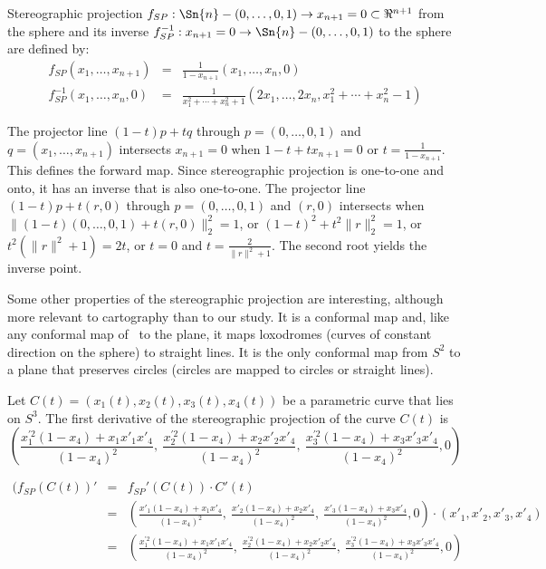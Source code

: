 \documentclass[11pt]{article}
\begin{document}
\begin{lemma}
Stereographic projection 
$f_{SP}: \Sn{n} - (0,\ldots,0,1) \rightarrow x_{n+1}=0 \subset \Re^{n+1}$ 
from the sphere
and its inverse $f_{SP}^{-1}: x_{n+1}=0 \rightarrow \Sn{n} - (0,\ldots,0,1)$ 
to the sphere
are defined by:
\begin{eqnarray*}
f_{SP}(x_1,\ldots,x_{n+1}) & = & \frac{1}{1-x_{n+1}} (x_1,\ldots,x_n,0) \\
f_{SP}^{-1}(x_1,\ldots,x_n,0) & = &
	\frac{1}{x_1^2 + \cdots + x_n^2 + 1} 
	(2x_1, \ldots, 2x_n, x_1^2 + \cdots + x_n^2 - 1)
\end{eqnarray*}	%
\end{lemma}
\vspace{.1in}
\prf
The projector line $(1-t)p + tq$ through $p = (0,\ldots,0,1)$ and 
$q = (x_1,\ldots,x_{n+1})$ intersects $x_{n+1}=0$ 
when $1-t + tx_{n+1} = 0$ or $t = \frac{1}{1-x_{n+1}}$.
This defines the forward map.
Since stereographic projection is one-to-one and onto,
it has an inverse that is also one-to-one.
The projector line $(1-t)p + t(r,0)$ through $p = (0,\ldots,0,1)$ and $(r,0)$
intersects  when $\|(1-t)(0,\ldots,0,1) + t(r,0)\|_2^2 = 1$,
or $(1-t)^2 + t^2\|r\|_2^2 = 1$, or $t^2(\|r\|^2 + 1) = 2t$, or 
$t=0$ and $t=\frac{2}{\|r\|^2 + 1}$.
The second root yields the inverse point.
\QED

Some other properties of the stereographic projection are interesting, although
more relevant to cartography than to our study.
It is a conformal map and, like any conformal map of \ to the plane,
it maps loxodromes (curves of constant direction on the sphere) to straight lines.
It is the only conformal map from $S^2$ to a plane that preserves
circles (circles are mapped to circles or straight lines).

\begin{lemma}
Let $C(t) = (x_1(t),x_2(t),x_3(t),x_4(t))$ be a parametric curve that lies on $S^3$.
The first derivative of the stereographic projection of the curve $C(t)$ is 
\[
(\frac{x^{'2}_1(1-x_4) + x_1x'_1x'_4}{(1-x_4)^2},\ 
                \frac{x^{'2}_2(1-x_4) + x_2x'_2x'_4}{(1-x_4)^2},\  
                  \frac{x^{'2}_3(1-x_4) + x_3x'_3x'_4}{(1-x_4)^2}, 0)
\]
\end{lemma}
\prf
\begin{eqnarray*}
(f_{SP}(C(t))' & = & f_{SP}'(C(t)) \cdot C'(t) \\
           & = & (\frac{x'_1(1-x_4) + x_1x'_4}{(1-x_4)^2},\ 
                  \frac{x'_2(1-x_4) + x_2x'_4}{(1-x_4)^2},\  
                  \frac{x'_3(1-x_4) + x_3x'_4}{(1-x_4)^2}, 0) 
		  \cdot (x'_1, x'_2, x'_3, x'_4) \\
           & = & (\frac{x^{'2}_1(1-x_4) + x_1x'_1x'_4}{(1-x_4)^2},\ 
                  \frac{x^{'2}_2(1-x_4) + x_2x'_2x'_4}{(1-x_4)^2},\  
                  \frac{x^{'2}_3(1-x_4) + x_3x'_3x'_4}{(1-x_4)^2}, 0)
\end{eqnarray*}
\QED
\end{document}
